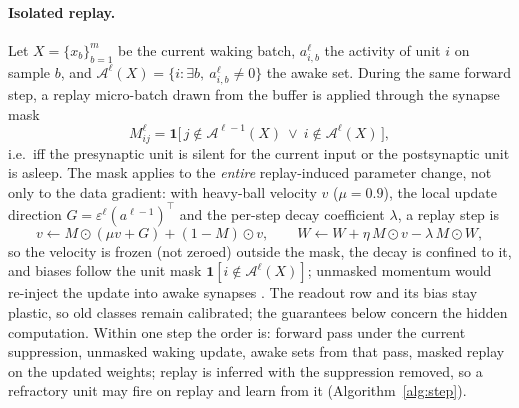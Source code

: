 \documentclass{article}
\begin{document}
\paragraph{Isolated replay.} Let $X=\{x_b\}_{b=1}^{m}$ be the current waking batch,
$a^\ell_{i,b}$ the activity of unit $i$ on sample $b$, and
$\mathcal{A}^\ell(X)=\{i:\exists b,\ a^\ell_{i,b}\neq0\}$ the awake set. During the same
forward step, a replay micro-batch drawn from the buffer is applied through the synapse mask
\begin{equation}
M^\ell_{ij}=\mathbf{1}\big[\,j\notin\mathcal{A}^{\ell-1}(X)\ \lor\ i\notin\mathcal{A}^\ell(X)\,\big],
\label{eq:mask}
\end{equation}
i.e.\ iff the presynaptic unit is silent for the current input or the postsynaptic unit is
asleep. The mask applies to the \emph{entire} replay-induced parameter change, not only to the
data gradient: with heavy-ball velocity $v$ ($\mu=0.9$), the local update direction
$G=\varepsilon^\ell(a^{\ell-1})^{\!\top}$ and the per-step decay coefficient $\lambda$, a
replay step is
\begin{equation}
v\leftarrow M\odot(\mu v+G)+(1-M)\odot v,\qquad
W\leftarrow W+\eta\,M\odot v-\lambda\,M\odot W,
\label{eq:maskedstep}
\end{equation}
so the velocity is frozen (not zeroed) outside the mask, the decay is confined to it, and
biases follow the unit mask $\mathbf{1}[i\notin\mathcal{A}^\ell(X)]$; unmasked momentum would
re-inject the update into awake synapses \citep{mckee2026,bricken2023}. The readout row and
its bias stay plastic, so old classes remain calibrated; the guarantees below concern the
hidden computation. Within one step the order is: forward pass under the current suppression,
unmasked waking update, awake sets from that pass, masked replay on the updated weights;
replay is inferred with the suppression removed, so a refractory unit may fire on replay and
learn from it (Algorithm~\ref{alg:step}).
\end{document}
